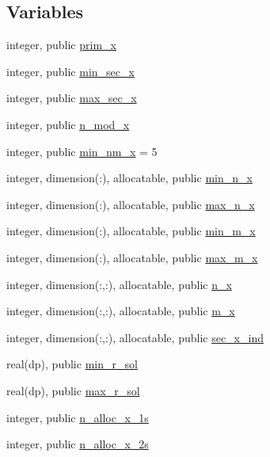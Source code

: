 \subsection*{Variables}
\begin{DoxyCompactItemize}
\item 
integer, public \hyperlink{namespacex__vars_ae7f7061534fb3ad68a538cdcea20d1d9}{prim\+\_\+x}
\item 
integer, public \hyperlink{namespacex__vars_a0d63825aabc4c71623c6ea7ffe033949}{min\+\_\+sec\+\_\+x}
\item 
integer, public \hyperlink{namespacex__vars_ae19ca528c5688228ff20912a45290b2a}{max\+\_\+sec\+\_\+x}
\item 
integer, public \hyperlink{namespacex__vars_a2e8fe6c5fe1cf61704bf176925d2b02e}{n\+\_\+mod\+\_\+x}
\item 
integer, public \hyperlink{namespacex__vars_adec89f548ba63e203297222dce675b94}{min\+\_\+nm\+\_\+x} = 5
\item 
integer, dimension(\+:), allocatable, public \hyperlink{namespacex__vars_a07485e5ebf54c236ae6f3c25e9cd2a93}{min\+\_\+n\+\_\+x}
\item 
integer, dimension(\+:), allocatable, public \hyperlink{namespacex__vars_a2f04400f8c1489db3f2d66fa972852a5}{max\+\_\+n\+\_\+x}
\item 
integer, dimension(\+:), allocatable, public \hyperlink{namespacex__vars_aae62c7b4f8043dcccad97454b5857690}{min\+\_\+m\+\_\+x}
\item 
integer, dimension(\+:), allocatable, public \hyperlink{namespacex__vars_aad66540f255243f66887442b9ef3c745}{max\+\_\+m\+\_\+x}
\item 
integer, dimension(\+:,\+:), allocatable, public \hyperlink{namespacex__vars_a61797a50c8f2d1cac7431894fe6d6ec0}{n\+\_\+x}
\item 
integer, dimension(\+:,\+:), allocatable, public \hyperlink{namespacex__vars_a23179dd22962147dfd992e800f0dfcc4}{m\+\_\+x}
\item 
integer, dimension(\+:,\+:), allocatable, public \hyperlink{namespacex__vars_afb8de8db92ae273f2581e0545370ecac}{sec\+\_\+x\+\_\+ind}
\item 
real(dp), public \hyperlink{namespacex__vars_a50c610efcf5afa4ec4b0eb7119b5d520}{min\+\_\+r\+\_\+sol}
\item 
real(dp), public \hyperlink{namespacex__vars_a0f45dfddb928623424eeb8b8bdd2b0f9}{max\+\_\+r\+\_\+sol}
\item 
integer, public \hyperlink{namespacex__vars_af565ad5c65071b130e69d528aa6faf1d}{n\+\_\+alloc\+\_\+x\+\_\+1s}
\item 
integer, public \hyperlink{namespacex__vars_add0d925899063fbe0c4ff05d21f35a23}{n\+\_\+alloc\+\_\+x\+\_\+2s}
\end{DoxyCompactItemize}


